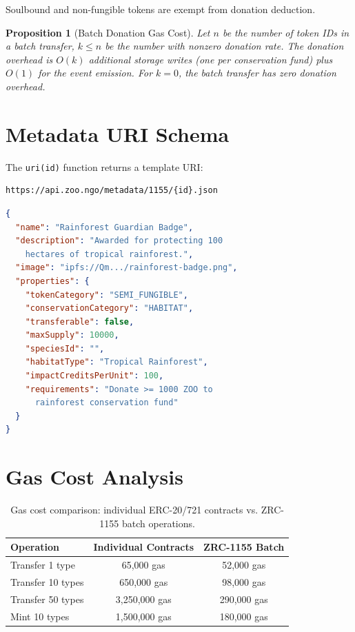 \documentclass[11pt,letterpaper]{article}
\newtheorem{proposition}[theorem]{Proposition}
\begin{document}
Soulbound and non-fungible tokens are exempt from donation deduction.

\begin{proposition}[Batch Donation Gas Cost]
Let $n$ be the number of token IDs in a batch transfer, $k \leq n$ be the number with nonzero donation rate. The donation overhead is $O(k)$ additional storage writes (one per conservation fund) plus $O(1)$ for the event emission. For $k = 0$, the batch transfer has zero donation overhead.
\end{proposition}

\section{Metadata URI Schema}

The \texttt{uri(id)} function returns a template URI:

\begin{verbatim}
https://api.zoo.ngo/metadata/1155/{id}.json
\end{verbatim}

\begin{lstlisting}[language=JSON,caption=ZRC-1155 metadata example]
{
  "name": "Rainforest Guardian Badge",
  "description": "Awarded for protecting 100
    hectares of tropical rainforest.",
  "image": "ipfs://Qm.../rainforest-badge.png",
  "properties": {
    "tokenCategory": "SEMI_FUNGIBLE",
    "conservationCategory": "HABITAT",
    "transferable": false,
    "maxSupply": 10000,
    "speciesId": "",
    "habitatType": "Tropical Rainforest",
    "impactCreditsPerUnit": 100,
    "requirements": "Donate >= 1000 ZOO to
      rainforest conservation fund"
  }
}
\end{lstlisting}

\section{Gas Cost Analysis}
\label{sec:gas}

\begin{table}[t]
\centering
\begin{tabular}{lcc}
\toprule
\textbf{Operation} & \textbf{Individual Contracts} & \textbf{ZRC-1155 Batch} \\
\midrule
Transfer 1 type & 65,000 gas & 52,000 gas \\
Transfer 10 types & 650,000 gas & 98,000 gas \\
Transfer 50 types & 3,250,000 gas & 290,000 gas \\
Mint 10 types & 1,500,000 gas & 180,000 gas \\
\bottomrule
\end{tabular}
\caption{Gas cost comparison: individual ERC-20/721 contracts vs. ZRC-1155 batch operations.}
\label{tab:gas}
\end{table}
\end{document}
